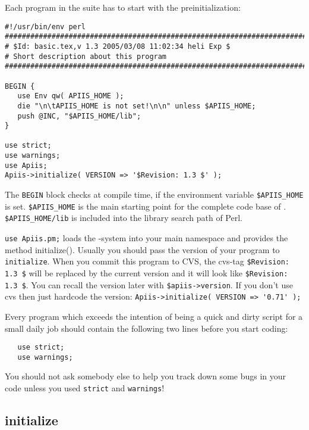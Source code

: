 
Each program in the \apiis{} suite has to start with the 
preinitialization:

\begin{verbatim}
#!/usr/bin/env perl
##############################################################################
# $Id: basic.tex,v 1.3 2005/03/08 11:02:34 heli Exp $
# Short description about this program
##############################################################################

BEGIN {
   use Env qw( APIIS_HOME );
   die "\n\tAPIIS_HOME is not set!\n\n" unless $APIIS_HOME;
   push @INC, "$APIIS_HOME/lib";
}

use strict;
use warnings;
use Apiis;
Apiis->initialize( VERSION => '$Revision: 1.3 $' );
\end{verbatim}

The \verb+BEGIN+ block checks at compile time, if the environment variable
\verb+$APIIS_HOME+ is set.
\verb+$APIIS_HOME+ is the main starting point for the complete code base of
\apiis. \verb+$APIIS_HOME/lib+ is included into the library search path of
Perl.

\verb+use Apiis.pm;+ loads the \apiis-system into your main namespace and
provides the method initialize().
Usually you should pass the version of your program to \verb+initialize+.
When you commit this program to CVS, the cvs-tag \verb+$Revision: 1.3 $+ will
be replaced by the current version and it will look like
\verb+$Revision: 1.3 $+. You can recall the version later with
\verb+$apiis->version+.
If you don't use cvs then just hardcode the version:
\verb+Apiis->initialize( VERSION => '0.71' );+

Every program which exceeds the intention of being a quick and dirty script for
a small daily job should contain the following two lines before you start coding:

\begin{verbatim}
   use strict;
   use warnings;
\end{verbatim}

You should not ask somebody else to help you track down some bugs in your code unless
you used \verb+strict+ and \verb+warnings+!

\subsection{initialize}

